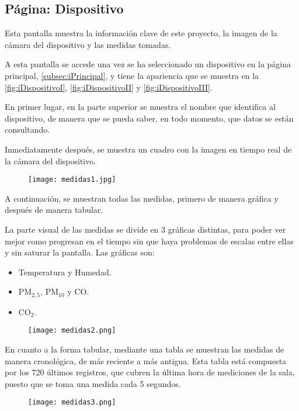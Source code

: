 \subsection{Página: Dispositivo}\label{subsec:iDispositivo}
Esta pantalla muestra la información clave de este proyecto, la imagen de la cámara del dispositivo y las medidas tomadas. 

A esta pantalla se accede una vez se ha seleccionado un dispositivo en la página principal, \autoref{subsec:iPrincipal}, y tiene la apariencia que se muestra en la \autoref{fig:iDispositivoI}, \autoref{fig:iDispositivoII} y \autoref{fig:iDispositivoIII}.

En primer lugar, en la parte superior se muestra el nombre que identifica al dispositivo, de manera que se pueda saber, en todo momento, que datos se están consultando.

Inmediatamente después, se muestra un cuadro con la imagen en tiempo real de la cámara del dispositivo.
\begin{figure}[H]
	{\texttt{[image: medidas1.jpg]}}
\end{figure}
A continuación, se muestran todas las medidas, primero de manera gráfica y después de manera tabular.

La parte visual de las medidas se divide en 3 gráficas distintas, para poder ver mejor como progresan en el tiempo sin que haya problemas de escalas entre ellas y sin saturar la pantalla. Las gráficas son:
\begin{itemize}
	\item Temperatura y Humedad.
	\item PM$_{2,5}$, PM$_{10}$ y CO\@.
	\item CO$_2$.
\end{itemize}
\begin{figure}[H]
	{\texttt{[image: medidas2.png]}}
\end{figure}
En cuanto a la forma tabular, mediante una tabla se muestran las medidas de manera cronológica, de más reciente a más antigua. Esta tabla está compuesta por los 720 últimos registros, que cubren la última hora de mediciones de la sala, puesto que se toma una medida cada 5 segundos.
\vspace{.5cm}
\begin{figure}[H]
	{\texttt{[image: medidas3.png]}}
\end{figure}

